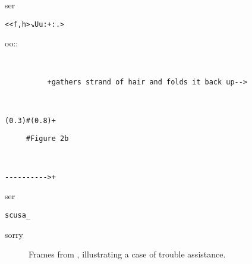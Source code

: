 \documentclass[output=paper,modfonts]{langscibook}
\begin{document}
%
\begin{transbox}{8}{ser}
\begin{verbatim}
<<f,h>↘Uu:+:.>
\end{verbatim}
\hspace{1.05cm}oo::
\end{transbox}\vspace{1mm}
%
\begin{mdframednoverticalspace}[style=secondfoc]
\begin{transbox}{9}{~}
\begin{verbatim}
          +gathers strand of hair and folds it back up-->
\end{verbatim}
\end{transbox}
\end{mdframednoverticalspace}\vspace{-1mm}
%
\begin{transbox}{10}{~}
\begin{verbatim}
(0.3)#(0.8)+
\end{verbatim}
\end{transbox}
%
\begin{transbox}{11}{\fig}
\begin{verbatim}
     #Figure 2b
\end{verbatim}
\end{transbox}\vspace{-0.75mm}
%
\begin{transbox}{12}{~}
\begin{verbatim}
---------->+
\end{verbatim}
\end{transbox}\vspace{-2mm}
%
\begin{transbox}{13}{ser}
\begin{verbatim}
scusa_
\end{verbatim}
sorry
\end{transbox}\bigskip

\begin{figure}
\caption{Frames from , illustrating a case of trouble assistance.}
\label{fig:rossi:2}
\end{figure}
\end{document}
